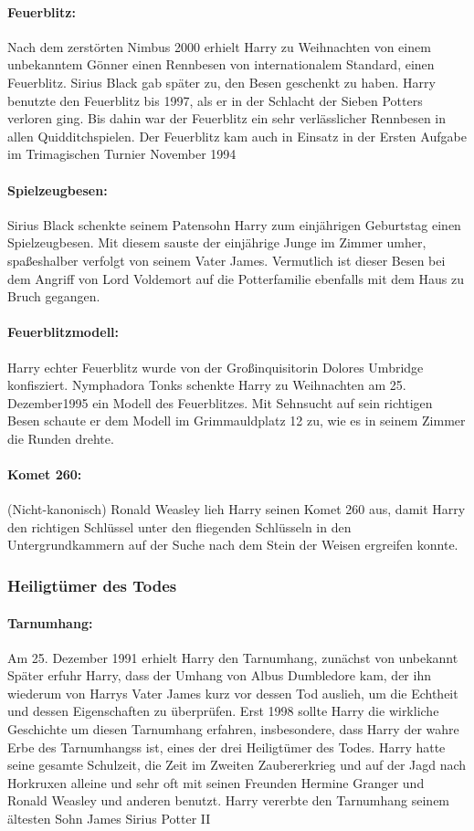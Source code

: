 \documentclass[a4paper, 10pt]{article}
\begin{document}
\paragraph{Feuerblitz:}
Nach dem zerstörten Nimbus 2000 erhielt Harry zu Weihnachten von einem unbekanntem Gönner einen Rennbesen von internationalem Standard, einen Feuerblitz. Sirius Black gab später zu, den Besen geschenkt zu haben. Harry benutzte den Feuerblitz bis 1997, als er in der Schlacht der Sieben Potters verloren ging. Bis dahin war der Feuerblitz ein sehr verlässlicher Rennbesen in allen Quidditchspielen. Der Feuerblitz kam auch in Einsatz in der Ersten Aufgabe im Trimagischen Turnier November 1994
\paragraph{Spielzeugbesen:}
Sirius Black schenkte seinem Patensohn Harry zum einjährigen Geburtstag einen Spielzeugbesen. Mit diesem sauste der einjährige Junge im Zimmer umher, spaßeshalber verfolgt von seinem Vater James. Vermutlich ist dieser Besen bei dem Angriff von Lord Voldemort auf die Potterfamilie ebenfalls mit dem Haus zu Bruch gegangen.
\paragraph{Feuerblitzmodell:}
Harry echter Feuerblitz wurde von der Großinquisitorin Dolores Umbridge konfisziert. Nymphadora Tonks schenkte Harry zu Weihnachten am 25. Dezember1995 ein Modell des Feuerblitzes. Mit Sehnsucht auf sein richtigen Besen schaute er dem Modell im Grimmauldplatz 12 zu, wie es in seinem Zimmer die Runden drehte.
\paragraph{Komet 260:}(Nicht-kanonisch)
Ronald Weasley lieh Harry seinen Komet 260 aus, damit Harry den richtigen Schlüssel unter den fliegenden Schlüsseln in den Untergrundkammern auf der Suche nach dem Stein der Weisen ergreifen konnte.

\subsubsection*{\large Heiligtümer des Todes}
\paragraph{Tarnumhang:}
Am 25. Dezember 1991 erhielt Harry den Tarnumhang, zunächst von unbekannt Später erfuhr Harry, dass der Umhang von Albus Dumbledore kam, der ihn wiederum von Harrys Vater James kurz vor dessen Tod auslieh, um die Echtheit und dessen Eigenschaften zu überprüfen. Erst 1998 sollte Harry die wirkliche Geschichte um diesen Tarnumhang erfahren, insbesondere, dass Harry der wahre Erbe des Tarnumhangss ist, eines der drei Heiligtümer des Todes. Harry hatte seine gesamte Schulzeit, die Zeit im Zweiten Zaubererkrieg und auf der Jagd nach Horkruxen alleine und sehr oft mit seinen Freunden Hermine Granger und Ronald Weasley und anderen benutzt. Harry vererbte den Tarnumhang seinem ältesten Sohn James Sirius Potter II
\end{document}
